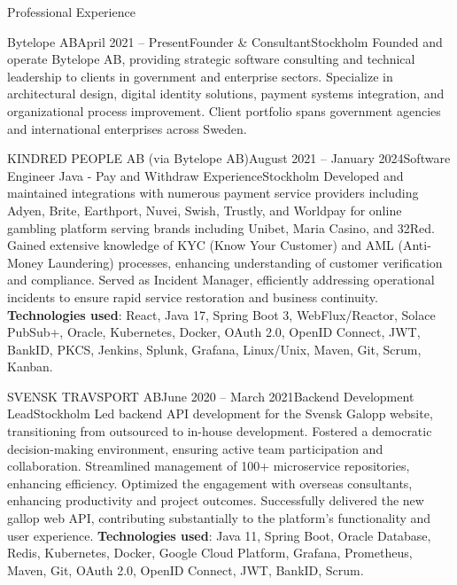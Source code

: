 \documentclass{resume}
\begin{document}
\begin{rSection}{Professional Experience}
\begin{rSubsection}{Bytelope AB}{April 2021 -- Present}{Founder \& Consultant}{Stockholm}
\bItem Founded and operate Bytelope AB, providing strategic software consulting and technical leadership to clients in government and enterprise sectors.
\bItem Specialize in architectural design, digital identity solutions, payment systems integration, and organizational process improvement.
\bItem Client portfolio spans government agencies and international enterprises across Sweden.
\end{rSubsection}

\begin{rClientSubsection}{KINDRED PEOPLE AB (via Bytelope AB)}{August 2021 -- January 2024}{Software Engineer Java - Pay and Withdraw Experience}{Stockholm}
\bItem Developed and maintained integrations with numerous payment service providers including Adyen, Brite, Earthport, Nuvei, Swish, Trustly, and Worldpay for online gambling platform serving brands including Unibet, Maria Casino, and 32Red.
\bItem Gained extensive knowledge of KYC (Know Your Customer) and AML (Anti-Money Laundering) processes, enhancing understanding of customer verification and compliance.
\bItem Served as Incident Manager, efficiently addressing operational incidents to ensure rapid service restoration and business continuity.
\bItem \textbf{Technologies used}: React, Java 17, Spring Boot 3, WebFlux/Reactor, Solace PubSub+, Oracle, Kubernetes, Docker, OAuth 2.0, OpenID Connect, JWT, BankID, PKCS, Jenkins, Splunk, Grafana, Linux/Unix, Maven, Git, Scrum, Kanban.
\end{rClientSubsection}

\begin{rSubsection}{SVENSK TRAVSPORT AB}{June 2020 -- March 2021}{Backend Development Lead}{Stockholm}
\bItem Led backend API development for the Svensk Galopp website, transitioning from outsourced to in-house development.
\bItem Fostered a democratic decision-making environment, ensuring active team participation and collaboration.
\bItem Streamlined management of 100+ microservice repositories, enhancing efficiency.
\bItem Optimized the engagement with overseas consultants, enhancing productivity and project outcomes.
\bItem Successfully delivered the new gallop web API, contributing substantially to the platform's functionality and user experience.
\bItem \textbf{Technologies used}: Java 11, Spring Boot, Oracle Database, Redis, Kubernetes, Docker, Google Cloud Platform, Grafana, Prometheus, Maven, Git, OAuth 2.0, OpenID Connect, JWT, BankID, Scrum.
\end{rSubsection}


\end{rSection}
\end{document}
